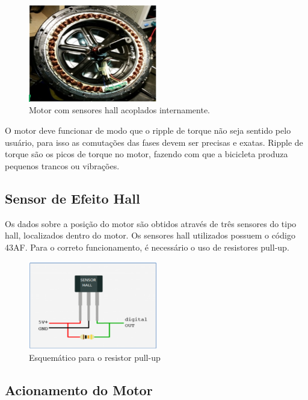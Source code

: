 	\graphicspath{{figuras/}}
	\begin{figure}[h!]
		\centering
		\includegraphics[width=0.5\textwidth]{Figura1_Motor.PNG}
		\caption{Motor com sensores hall acoplados internamente.}
		\label{img:Motor}
	\end{figure}

	O motor deve funcionar de modo que o ripple de torque não seja sentido pelo usuário, para isso as comutações das fases devem ser precisas e exatas. Ripple de torque são os picos de torque no motor, fazendo com que a bicicleta produza pequenos trancos ou vibrações.
	
	\subsection{Sensor de Efeito Hall}
	Os dados sobre a posição do motor são obtidos através de três sensores do tipo hall, localizados dentro do motor. Os sensores hall utilizados possuem o código 43AF. Para o correto funcionamento, é necessário o uso de resistores pull-up.
	
	\graphicspath{{figuras/}}
	\begin{figure}[h!]
		\centering
		\includegraphics[width=0.5\textwidth]{Figura2_Pull_UP.PNG}
		\caption{Esquemático para o resistor pull-up}
		\label{img:Pull_UP}
	\end{figure}

	\subsection{Acionamento do Motor}
